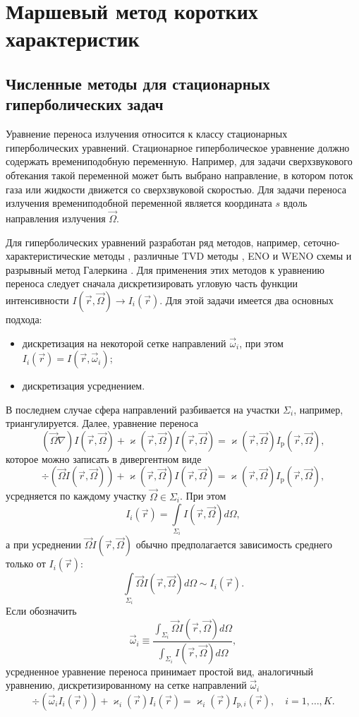 \chapter{Маршевый метод коротких характеристик}

\section{Численные методы для стационарных гиперболических задач}

Уравнение переноса излучения относится к классу стационарных гиперболических уравнений. Стационарное гиперболическое уравнение должно содержать времениподобную переменную. Например, для задачи сверхзвукового обтекания такой переменной может быть выбрано направление, в котором поток газа или жидкости движется со сверхзвуковой скоростью. Для задачи переноса излучения времениподобной переменной является координата $s$ вдоль направления излучения $\vec \Omega$. 

Для гиперболических уравнений разработан ряд методов, например, сеточно-характеристические методы \cite{Kholodov}, различные TVD методы \cite{Godunov,vanLeer,Leveque,Toro}, ENO и WENO схемы \cite{Shu} и разрывный метод Галеркина \cite{Cockburn}. Для применения этих методов к уравнению переноса следует сначала дискретизировать угловую часть функции интенсивности $I(\vec r, \vec \Omega) \to I_i(\vec r)$. Для этой задачи имеется два основных подхода:
\begin{itemize}
\item дискретизация на некоторой сетке направлений $\vec \omega_i$, при этом $I_i(\vec r) = I(\vec r, \vec \omega_i)$;
\item дискретизация усреднением.
\end{itemize}
В последнем случае сфера направлений разбивается на участки $\Sigma_i$, например, триангулируется. Далее, уравнение переноса 
\[
(\vec \Omega \nabla) I(\vec r, \vec \Omega) + \varkappa(\vec r, \vec \Omega) I(\vec r, \vec \Omega) = \varkappa(\vec r, \vec \Omega) I_\text{p}(\vec r, \vec \Omega),
\]
которое можно записать в дивергентном виде
\[
\div \left(\vec \Omega I(\vec r, \vec \Omega)\right) + \varkappa(\vec r, \vec \Omega) I(\vec r, \vec \Omega) = \varkappa(\vec r, \vec \Omega) I_\text{p}(\vec r, \vec \Omega),
\]
усредняется по каждому участку $\vec \Omega \in \Sigma_i$. При этом
\[
I_i(\vec r) = \int\limits_{\Sigma_i} I(\vec r, \vec \Omega) d\Omega,
\]
а при усреднении $\vec \Omega I(\vec r, \vec \Omega)$ обычно предполагается зависимость среднего только от $I_i(\vec r)$:
\[
\int\limits_{\Sigma_i} \vec \Omega I(\vec r, \vec \Omega) d\Omega \sim I_i(\vec r).
\]
Если обозначить
\[
\vec \omega_i \equiv \frac{\int_{\Sigma_i} \vec \Omega I(\vec r, \vec \Omega) d\Omega}{\int_{\Sigma_i} I(\vec r, \vec \Omega) d\Omega},
\]
усредненное уравнение переноса принимает простой вид, аналогичный уравнению, дискретизированному на сетке направлений $\vec \omega_i$
\begin{equation}
\div (\vec \omega_i I_i(\vec r)) + \varkappa_i(\vec r) I_i(\vec r) = \varkappa_i(\vec r) I_{\text{p},i}(\vec r),\quad i = 1, \dots, K.
\label{eq:grid}
\end{equation}

